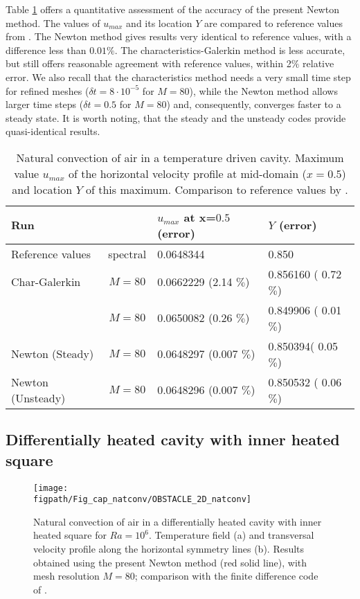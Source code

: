 Table \ref{tab-T1} offers a quantitative assessment of the accuracy of the present Newton method. The values of $u_{max}$  and its location $Y$ are compared to reference values from \cite{LeQuere91}. The Newton method gives results very identical to reference values, with a difference less than $0.01 \%$. 
The characteristics-Galerkin method is less accurate, but still offers reasonable agreement with reference values, within 2$\%$ relative error. We also recall that the characteristics method needs a very small time step for refined meshes ($\delta t = 8\cdot 10^{-5}$ for $M=80$), while the Newton method allows larger time steps ($\delta t = 0.5$ for $M=80$) and, consequently, converges faster to a steady state.
It is worth noting, that the steady and the unsteady codes provide quasi-identical results.
\begin{table}[!h]
	\begin{center}
		\begin{tabular}{|l|c|l|l|}
			\hline
			\multicolumn{2}{|l|}{Run} & $u_{max}$ at x=$0.5$ (error) & $Y$ (error) \\
			\hline
			Reference values & spectral & 0.0648344           & 0.850 \\ \hline
			Char-Galerkin       &$M=80$ & 0.0662229 (2.14 $\%$) & 0.856160 ( 0.72 $\%$) \\ \hline
			\cite{dan-2014-JCP}              &$M=80$ & 0.0650082 (0.26 $\%$) & 0.849906 ( 0.01 $\%$) \\ \hline
			Newton (Steady)        &$M=80$ & 0.0648297 (0.007 $\%$) & 0.850394( 0.05 $\%$) \\ \hline
			Newton (Unsteady)        &$M=80$ & 0.0648296 (0.007 $\%$) & 0.850532 ( 0.06 $\%$) \\ \hline
		\end{tabular}
	\end{center}
	\caption {Natural convection of air in a temperature driven cavity. Maximum value $u_{max}$ of the horizontal velocity profile at mid-domain ($x=0.5$) and location $Y$ of this maximum. Comparison to reference values by \cite{LeQuere91}.}
	\label{tab-T1}
\end{table}

\subsection{Differentially heated cavity with inner heated square} \label{sub-2D-OBSTACLE}

\begin{figure}
	\begin{center}
		\texttt{[image: \\figpath/Fig\_cap\_natconv/OBSTACLE\_2D\_natconv]} 
	\end{center}
	\caption{Natural convection of air in a differentially heated cavity with inner heated square for $Ra = 10^6$. Temperature field (a) and transversal velocity profile along the  horizontal symmetry lines (b). Results obtained using the present Newton method (red solid line), with mesh resolution $M=80$; comparison with the finite difference code of \cite{Raluca2013}.}
	\label{fig-obst-2D}
\end{figure}

